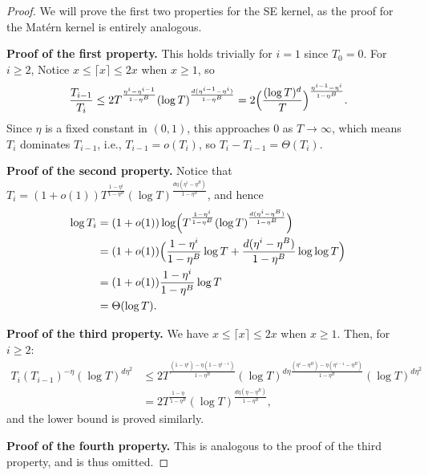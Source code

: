 \documentclass[10pt]{article}
\begin{document}
\begin{proof}
    We will prove the first two properties for the SE kernel, as the proof for the Mat\'ern kernel is entirely analogous.
    
    \textbf{Proof of the first property.}
    This holds trivially for $i=1$ since $T_0=0 $. For $i \geq 2$, 
    Notice $x\leq \lceil x\rceil \leq 2x $ when $x\geq 1$, so
    \begin{align}
        \frac{T_{i-1}}{T_{i}}
        \leq 2 T^{\frac{\eta^i-\eta^{i-1}}{1-\eta^B}} (\log T)^{\frac{d(\eta^{i-1}-\eta^i)}{1-\eta^B}}
        = 2 \Bigl(\frac{(\log T)^{d}}{T}\Bigr)^{\frac{\eta^{i-1}-\eta^i}{1-\eta^B}}.
    \end{align}
    Since $\eta$ is a fixed constant in $(0,1)$, this approaches $0$ as $T \to \infty$,
    which means $T_i$ dominates $T_{i-1}$, i.e., $T_{i-1}=o(T_i)$, so $T_i-T_{i-1}=\Theta(T_i)$.

    \textbf{Proof of the second property.} Notice that $T_i =(1+o(1)) T^{\frac{1-\eta^i}{1-\eta^B}}(\log T)^{\frac{d\eta(\eta^i- \eta^B)}{1-\eta^B}}$, and hence
    \begin{align}
        \log T_i
        & = (1+ o(1))\log\Bigl( T^{\frac{1-\eta^i}{1-\eta^B}}(\log T)^{\frac{d(\eta^i- \eta^B)}{1-\eta^B}}\Bigr) \\
        & = (1+ o(1)) \Bigl( \frac{1-\eta^i}{1-\eta^B}\log T+\frac{d(\eta^i- \eta^B)}{1-\eta^B}\log\log T\Bigr) \\
        & = (1+ o(1)) \frac{1-\eta^i}{1-\eta^B}\log T \\
        & = \Theta(\log T).
    \end{align}
    
    \textbf{Proof of the third property.} We have $x\leq \lceil x\rceil \leq 2x $ when $x\geq 1$. Then, for $i\geq 2$:
    \begin{align}
        T_i(T_{i-1})^{-\eta}(\log T)^{d\eta^2}
        & \leq 2 T^{\frac{(1-\eta^i)-\eta(1-\eta^{i-1})}{1-\eta^B}}(\log T)^{d\eta\frac{(\eta^i- \eta^B) - \eta(\eta^{i-1}- \eta^B)}{1-\eta^B}} (\log T)^{d\eta^2} \\
        & = 2 T^{\frac{1-\eta}{1-\eta^B}}(\log T)^{\frac{d\eta(\eta-\eta^B)}{1-\eta^B}},
    \end{align}    
    and the lower bound is proved similarly.
    
    \textbf{Proof of the fourth property.} This is analogous to the proof of the third property, and is thus omitted.
\end{proof}
\end{document}
